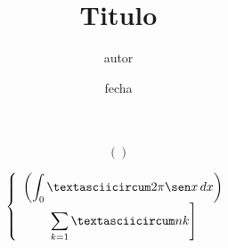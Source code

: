 \documentclass[a4paper]{article}
\title{Titulo}
\author{autor }
\date{fecha}
\begin{document}
 

	$$

		\left( %

		\right) %

	$$


	$$
		\left\{ \begin{array}{c}
		\left(\displaystyle \int_0ˆ{2\pi}
		\sen x\,dx\right)\\
		\left.\displaystyle \sum_{k=1}ˆn k \right]
		\end{array} \right.
	$$
\end{document}
